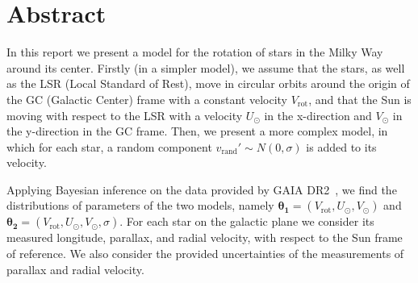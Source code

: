 \section*{Abstract}

In this report we present a model for the rotation of stars in the Milky Way around its center.
Firstly (in a simpler model), we assume that the stars, as well as the LSR (Local Standard of Rest), 
move in circular orbits around the origin of the GC (Galactic Center) frame with a constant velocity $V_{\text{rot}}$, and that the Sun is moving with respect to the LSR with a velocity $U_{\odot}$ in the x-direction and $V_{\odot}$ in the y-direction in the GC frame. 
Then, we present a more complex model, in which for each star, a random component $v_{\text{rand}}' \sim N(0, \sigma)$ is added to its velocity.


Applying Bayesian inference on the data provided by GAIA DR2~\cite{GAIADR2}, we find the distributions of parameters of the two models, namely $\mathbf{\theta_1} = (V_{\text{rot}}, U_{\odot}, V_{\odot})$ and $\mathbf{\theta_2} = (V_{\text{rot}}, U_{\odot}, V_{\odot}, \sigma)$.
For each star on the galactic plane we consider its measured longitude, parallax, and radial velocity, with respect to the Sun frame of reference.
We also consider the provided uncertainties of the measurements of parallax and radial velocity.

